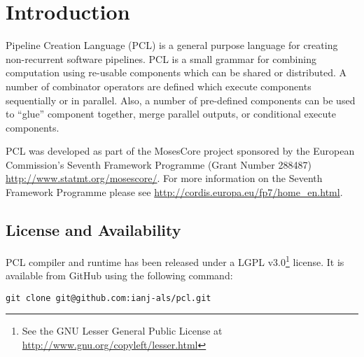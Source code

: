 \chapter{Introduction}
Pipeline Creation Language (PCL) is a general purpose language for creating non-recurrent software pipelines. PCL is a small grammar for combining computation using re-usable components which can be shared or distributed. A number of combinator operators are defined which execute components sequentially or in parallel. Also, a number of pre-defined components can be used to ``glue'' component together, merge parallel outputs, or conditional execute components.

PCL was developed as part of the MosesCore project sponsored by the European Commission's Seventh Framework Programme (Grant Number 288487) \url{http://www.statmt.org/mosescore/}. For more information on the Seventh Framework Programme please see \url{http://cordis.europa.eu/fp7/home_en.html}.

\section{License and Availability}
PCL compiler and runtime has been released under a LGPL v3.0\footnote{See the GNU Lesser General Public License at \url{http://www.gnu.org/copyleft/lesser.html}} license. It is available from GitHub using the following command:
\begin{verbatim}
git clone git@github.com:ianj-als/pcl.git
\end{verbatim}
